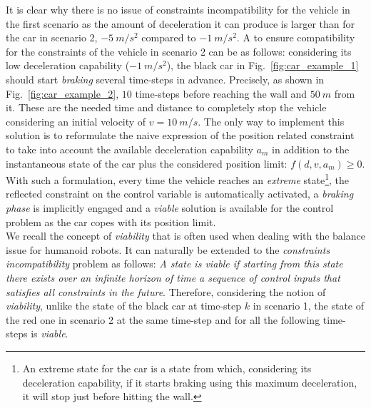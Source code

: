 It is clear why there is no issue of constraints incompatibility for the vehicle in the first scenario as the amount of deceleration it can produce is larger than for the car in scenario 2, $-5~m/s^2$ compared to $-1~m/s^2$. A  to ensure compatibility for the constraints of the vehicle in scenario 2 can be as follows: considering its low deceleration capability ($-1~m/s^2$), the black car in  Fig.~\ref{fig:car_example_1} should start \textit{braking} several time-steps in advance. Precisely, as shown in Fig.~\ref{fig:car_example_2}, $10$ time-steps before reaching the wall and $50~m$ from it. These are the needed time and distance to completely stop the vehicle considering an initial velocity of $v=10~m/s$. The only way to implement this solution is to reformulate the naive expression of the position related constraint to take into account the available deceleration capability $a_m$ in addition to the instantaneous state of the car plus the considered position limit: $f(d,v,a_{m})\geq 0$. With such a formulation, every time the vehicle reaches an \textit{extreme} state\footnote{An extreme state for the car is a state from which, considering its deceleration capability, if it starts braking using this maximum deceleration, it will stop just before hitting the wall.}, the reflected constraint on the control variable is automatically activated, a \textit{braking phase} is  implicitly engaged and a \textit{viable} \cite{aubin1991viability} solution is available for the control problem as the car copes with its position limit. 
\\
We recall the concept of \textit{viability} \cite{aubin2011viability} that is often used when dealing with the balance issue for humanoid robots. It can naturally be extended to the \textit{constraints incompatibility} problem \cite{fraichard2007short} as follows: \textit{A state is viable if starting from this state there exists over an infinite horizon of time a sequence of control inputs that satisfies all constraints in the future}. Therefore, considering the notion of \textit{viability}, unlike the state of the black car at time-step $k$ in scenario 1, the state of the red one in scenario 2 at the same time-step and for all the following time-steps is \textit{viable}. 
